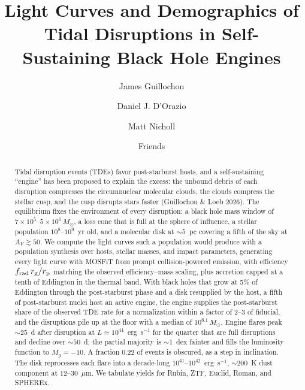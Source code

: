 \documentclass[twocolumn,pdftex]{aastex701}
\begin{document}
\title{Light Curves and Demographics of Tidal Disruptions in Self-Sustaining Black Hole Engines}


\author[0000-0002-9809-8215]{James Guillochon}

\author[0000-0002-1271-6247]{Daniel J. D'Orazio}

\author[0000-0002-2555-3192]{Matt Nicholl}

\author{Friends}

\begin{abstract}
Tidal disruption events (TDEs) favor post-starburst hosts, and a self-sustaining ``engine'' has been proposed to explain the excess: the unbound debris of each disruption compresses the circumnuclear molecular clouds, the clouds compress the stellar cusp, and the cusp disrupts stars faster (Guillochon \& Loeb 2026). The equilibrium fixes the environment of every disruption: a black hole mass window of $7\times10^{5}$--$5\times10^{6}\,M_{\odot}$, a loss cone that is full at the sphere of influence, a stellar population $10^{8}$--$10^{9}$~yr old, and a molecular disk at $\sim5$~pc covering a fifth of the sky at $A_V\gtrsim50$. We compute the light curves such a population would produce with a population synthesis over hosts, stellar masses, and impact parameters, generating every light curve with MOSFiT from prompt collision-powered emission, with efficiency $f_{\rm rad}\,r_{\rm g}/r_{\rm p}$ matching the observed efficiency--mass scaling, plus accretion capped at a tenth of Eddington in the thermal band. With black holes that grow at 5\% of Eddington through the post-starburst phase and a disk resupplied by the host, a fifth of post-starburst nuclei host an active engine, the engine supplies the post-starburst share of the observed TDE rate for a normalization within a factor of 2--3 of fiducial, and the disruptions pile up at the floor with a median of $10^{6.1}\,M_{\odot}$. Engine flares peak $\sim25$~d after disruption at $L\simeq10^{44}$~erg~s$^{-1}$ for the quarter that are full disruptions and decline over $\sim50$~d; the partial majority is $\sim1$~dex fainter and fills the luminosity function to $M_g=-10$. A fraction 0.22 of events is obscured, as a step in inclination. The disk reprocesses each flare into a decade-long $10^{41}$--$10^{42}$~erg~s$^{-1}$, $\sim200$~K dust component at 12--30~$\mu$m. We tabulate yields for Rubin, ZTF, Euclid, Roman, and SPHEREx.
\end{abstract}
\end{document}
